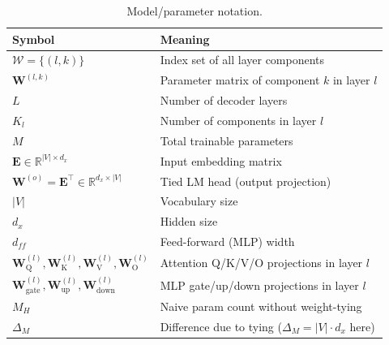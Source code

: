 \begin{table}[htb!]
    \centering
    \small
    \begin{tabular}{ll}
        \textbf{Symbol} & \textbf{Meaning} \\
        \hline
        $\mathcal{W}=\{(l,k)\}$ & Index set of all layer components \\
        $\mathbf{W}^{(l,k)}$ & Parameter matrix of component $k$ in layer $l$ \\
        $L$ & Number of decoder layers \\
        $K_l$ & Number of components in layer $l$ \\
        $M$ & Total trainable parameters \\
        $\mathbf{E}\in\mathbb{R}^{|V|\times d_x}$ & Input embedding matrix \\
        $\mathbf{W}^{(o)}=\mathbf{E}^{\top}\in\mathbb{R}^{d_x\times|V|}$ & Tied LM head (output projection) \\
        $|V|$ & Vocabulary size \\
        $d_x$ & Hidden size \\
        $d_{ff}$ & Feed-forward (MLP) width \\
        $\mathbf{W}^{(l)}_{\mathrm{Q}},\mathbf{W}^{(l)}_{\mathrm{K}},\mathbf{W}^{(l)}_{\mathrm{V}},\mathbf{W}^{(l)}_{\mathrm{O}}$ & Attention Q/K/V/O projections in layer $l$ \\
        $\mathbf{W}^{(l)}_{\text{gate}},\mathbf{W}^{(l)}_{\text{up}},\mathbf{W}^{(l)}_{\text{down}}$ & MLP gate/up/down projections in layer $l$ \\
        $M_H$ & Naive param count without weight-tying \\
        $\Delta_M$ & Difference due to tying ($\Delta_M=|V|\cdot d_x$ here) \\
    \end{tabular}
    \caption{Model/parameter notation.}
    \label{tab:nomenclature-params}
\end{table}

